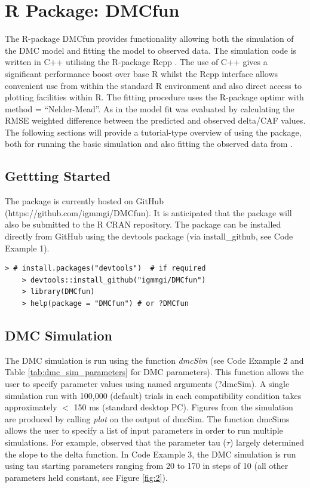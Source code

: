 \section{R Package: DMCfun} 
The R-package DMCfun provides functionality allowing both the simulation of the
DMC model and fitting the model to observed data. The simulation code is
written in C++ utilising the R-package Rcpp \parencite{eddelbuettel2011rcpp}.
The use of C++ gives a significant performance boost over base R whilst the
Rcpp interface allows convenient use from within the standard R environment
and also direct access to plotting facilities within R. The fitting procedure
uses the R-package optimr \textcite{optimr} with method = ``Nelder-Mead''. As in
\textcite{ulrich2015automatic} the model fit was evaluated by calculating the
RMSE weighted difference between the predicted and observed delta/CAF values.
The following sections will provide a tutorial-type overview of using the
package, both for running the basic simulation and also fitting the observed
data from \textcite{ulrich2015automatic}.

\label{dmc_fun}
\subsection{Gettting Started}
\label{getting_started}
The package is currently hosted on GitHub (https://github.com/igmmgi/DMCfun).
It is anticipated that the package will also be submitted to the R CRAN
repository. The package can be installed directly from GitHub using the
devtools package (via install\_github, see Code Example 1).

\begin{minipage}{\linewidth}
    \begin{lstlisting}[style = R, title={R Code Example 1: Instalation}, captionpos=t]
    > # install.packages("devtools")  # if required
    > devtools::install_github("igmmgi/DMCfun")
    > library(DMCfun)
    > help(package = "DMCfun") # or ?DMCfun
    \end{lstlisting}
\end{minipage}

\subsection{DMC Simulation}
\label{dmc_simulation}
The DMC simulation is run using the function \textit{dmcSim} (see Code Example
2 and Table \ref{tab:dmc_sim_parameters} for DMC parameters). This function allows
the user to specify parameter values using named arguments (?dmcSim). A single
simulation run with 100,000 (default) trials in each compatibility condition
takes approximately $<$ 150 ms (standard desktop PC). Figures from the
simulation are produced by calling \textit{plot} on the output of dmcSim. The
function dmcSims allows the user to specify a list of input parameters in order
to run multiple simulations. For example, \textcite{ulrich2015automatic}
observed that the parameter tau ($\tau$) largely determined the slope to the
delta function. In Code Example 3, the DMC simulation is run using tau starting
parameters ranging from 20 to 170 in steps of 10 (all other parameters held constant,
see Figure \ref{fig:2}).

